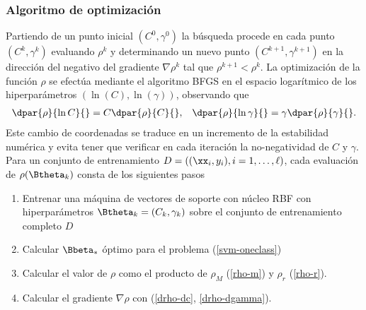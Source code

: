 %
\subsubsection{Algoritmo de optimización}
%
Partiendo de un punto inicial $(C^0,\gamma^0)$ la búsqueda procede
en cada punto $(C^k,\gamma^k)$ evaluando $\rho^k$ y determinando
un nuevo punto $(C^{k+1},\gamma^{k+1})$ en la dirección del
negativo del gradiente $\nabla\rho^k$ tal que $\rho^{k+1}<\rho^k$.
La optimización de la función $\rho$ se efectúa mediante el algoritmo
BFGS \cite{nocedal} en el espacio logarítmico de los hiperparámetros
$(\ln(C),\ln(\gamma))$, observando que
%
\begin{align}
  \dpar{\rho}{\ln C}{}= C \dpar{\rho}{C}{}, &&
  \dpar{\rho}{\ln \gamma}{}= \gamma \dpar{\rho}{\gamma}{}.
\end{align}
%
Este cambio de coordenadas se traduce en un incremento de la
estabilidad numérica y evita tener que verificar en cada iteración la
no-negatividad de $C$ y $\gamma$.
Para un conjunto de entrenamiento $D=((\xx_i,y_i),i=1,\ldots,\ell)$,
cada evaluación de $\rho(\Btheta_k)$ consta de los siguientes pasos
%
\begin{enumerate}
\item Entrenar una máquina de vectores de soporte con núcleo RBF
  con hiperparámetros $\Btheta_k=(C_k,\gamma_k)$ sobre el conjunto
  de entrenamiento completo $D$
\item Calcular $\Bbeta_*$ óptimo para el problema (\ref{svm-oneclass})
\item Calcular el valor de $\rho$ como el producto de
  $\rho_M$ (\ref{rho-m}) y $\rho_r$ (\ref{rho-r}).
\item Calcular el gradiente $\nabla\rho$ con (\ref{drho-dc}, \ref{drho-dgamma}).
\end{enumerate}
%

